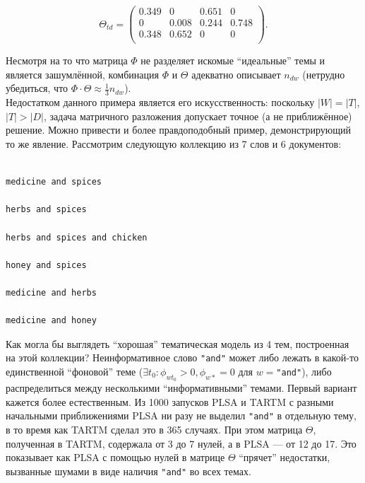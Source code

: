 \[ 

\Theta_{td} =  

\begin{pmatrix} 

    0.349 & 0 & 0.651 & 0 \\ 

    0 & 0.008 & 0.244 & 0.748 \\ 

    0.348 & 0.652 & 0 & 0 \\ 

\end{pmatrix}. 

\] 

Несмотря на то что матрица $\Phi$ не разделяет искомые ``идеальные'' темы и является зашумлённой, комбинация $\Phi$ и $\Theta$ адекватно описывает $n_{dw}$ (нетрудно убедиться, что $\Phi \cdot \Theta \approx \frac{1}{3} n_{dw}$).\\ 

 

Недостатком данного примера является его искусственность: поскольку $|W|=|T|$, $|T|>|D|$, задача матричного разложения допускает точное (а не приближённое) решение. Можно привести и более правдоподобный пример, демонстрирующий то же явление. Рассмотрим следующую коллекцию из 7 слов и 6 документов: 

\begin{verbatim} 

medicine and spices 

herbs and spices 

herbs and spices and chicken 

honey and spices 

medicine and herbs 

medicine and honey  

\end{verbatim} 

 

Как могла бы выглядеть ``хорошая'' тематическая модель из 4 тем, построенная на этой коллекции? Неинформативное слово \texttt{"and"} может либо лежать в какой-то единственной ``фоновой'' теме ($\exists t_0: \phi_{wt_0} > 0, \phi_{w\ast} = 0$ для $w=$\texttt{"and"}), либо распределиться между несколькими ``информативными'' темами. Первый вариант кажется более естественным. Из 1000 запусков PLSA и TARTM с разными начальными приближениями PLSA ни разу не выделил \texttt{"and"} в отдельную тему, в то время как TARTM сделал это в 365 случаях. При этом матрица $\Theta$, полученная в TARTM, содержала от 3 до 7 нулей, а в PLSA --- от 12 до 17. Это показывает как PLSA с помощью нулей в матрице $\Theta$ ``прячет'' недостатки, вызванные шумами в виде наличия \texttt{"and"} во всех темах. 

